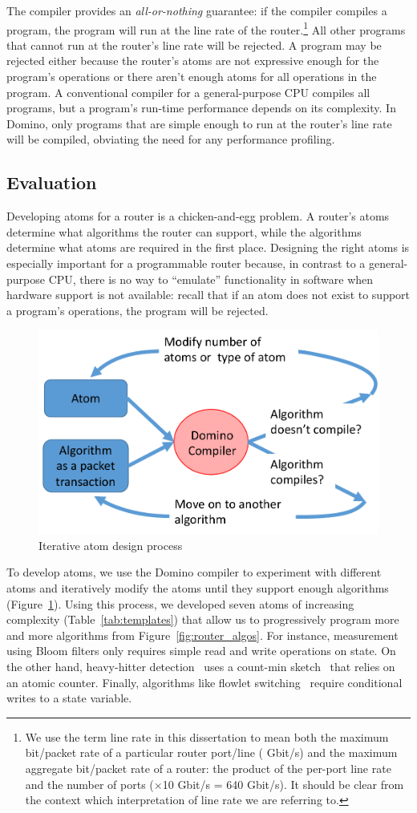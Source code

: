 The compiler provides an {\em all-or-nothing} guarantee: if the compiler
compiles a program, the program will run at the line rate of the
router.\footnote{We use the term line rate in this dissertation to mean both
the maximum bit/packet rate of a particular router port/line ( Gbit/s)
and the maximum aggregate bit/packet rate of a router: the product of the
per-port line rate and the number of ports ($\times$10 Gbit/s = 640 Gbit/s).
It should be clear from the context which interpretation of line rate we are
referring to. } All other programs that cannot run at the router's line rate
will be rejected. A program may be rejected either because the router's atoms
are not expressive enough for the program's operations or there aren't enough
atoms for all operations in the program. A conventional compiler for a
general-purpose CPU compiles all programs, but a program's run-time performance
depends on its complexity. In Domino, only programs that are simple enough to
run at the router's line rate will be compiled, obviating the need for any
performance profiling.

\subsection{Evaluation}
Developing atoms for a router is a chicken-and-egg problem. A router's atoms
determine what algorithms the router can support, while the algorithms
determine what atoms are required in the first place. Designing the right atoms
is especially important for a programmable router because, in contrast to a
general-purpose CPU, there is no way to ``emulate'' functionality in software
when hardware support is not available: recall that if an atom does not exist
to support a program's operations, the program will be rejected.

\begin{figure}
\centering
\includegraphics[width=0.5\columnwidth]{iterative_design_process.pdf}
\caption{Iterative atom design process}
\label{fig:iterative_design}
\end{figure}

To develop atoms, we use the Domino compiler to experiment with different atoms
and iteratively modify the atoms until they support enough algorithms
(Figure~\ref{fig:iterative_design}).  Using this process, we developed seven
atoms of increasing complexity (Table~\ref{tab:templates}) that allow us to
progressively program more and more algorithms from
Figure~\ref{fig:router_algos}. For instance, measurement using Bloom filters
only requires simple read and write operations on state. On the other hand,
heavy-hitter detection~\cite{opensketch} uses a count-min sketch~\cite{cormode}
that relies on an atomic counter. Finally, algorithms like flowlet
switching~\cite{flowlets} require conditional writes to a state variable.


